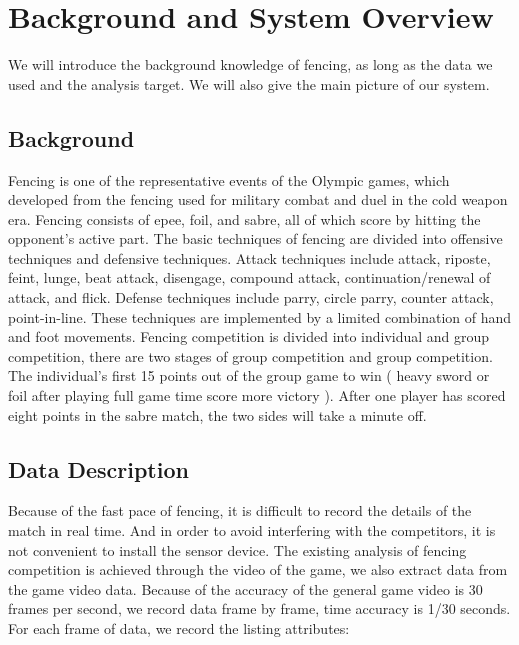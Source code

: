 \documentclass[journal]{vgtc}                %
\begin{document}
\section{Background and System Overview}
We will introduce the background knowledge of fencing, as long as the data we used and the analysis target. We will also give the main picture of our system.
\subsection{Background}
Fencing is one of the representative events of the Olympic games, which developed from the fencing used for military combat and duel in the cold weapon era.
Fencing consists of epee, foil, and sabre, all of which score by hitting the opponent's active part.
The basic techniques of fencing are divided into offensive techniques and defensive techniques.
Attack techniques include attack, riposte, feint, lunge, beat attack, disengage, compound attack, continuation/renewal of attack, and flick.
Defense techniques include parry, circle parry, counter attack, point-in-line.
These techniques are implemented by a limited combination of hand and foot movements.
Fencing competition is divided into individual and group competition, there are two stages of group competition and group competition.
The individual's first 15 points out of the group game to win ( heavy sword or foil after playing full game time score more victory ).
After one player has scored eight points in the sabre match, the two sides will take a minute off.


	
\subsection{Data Description}
Because of the fast pace of fencing, it is difficult to record the details of the match in real time.
And in order to avoid interfering with the competitors, it is not convenient to install the sensor device.
The existing analysis of fencing competition is achieved through the video of the game, we also extract data from the game video data.
Because of the accuracy of the general game video is 30 frames per second, we record data frame by frame, time accuracy is 1/30 seconds. For each frame of data, we record the listing attributes:
\end{document}
